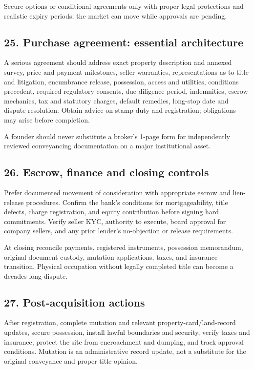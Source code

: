 Secure options or conditional agreements only with proper legal protections and realistic expiry periods; the market can move while approvals are pending.


\subsection{25. Purchase agreement: essential architecture}

A serious agreement should address exact property description and annexed survey, price and payment milestones, seller warranties, representations as to title and litigation, encumbrance release, possession, access and utilities, conditions precedent, required regulatory consents, due diligence period, indemnities, escrow mechanics, tax and statutory charges, default remedies, long-stop date and dispute resolution. Obtain advice on stamp duty and registration; obligations may arise before completion.

A founder should never substitute a broker's 1-page form for independently reviewed conveyancing documentation on a major institutional asset.


\subsection{26. Escrow, finance and closing controls}

Prefer documented movement of consideration with appropriate escrow and lien-release procedures. Confirm the bank's conditions for mortgageability, title defects, charge registration, and equity contribution before signing hard commitments. Verify seller KYC, authority to execute, board approval for company sellers, and any prior lender's no-objection or release requirements.

At closing reconcile payments, registered instruments, possession memorandum, original document custody, mutation applications, taxes, and insurance transition. Physical occupation without legally completed title can become a decades-long dispute.


\subsection{27. Post-acquisition actions}

After registration, complete mutation and relevant property-card/land-record updates, secure possession, install lawful boundaries and security, verify taxes and insurance, protect the site from encroachment and dumping, and track approval conditions. Mutation is an administrative record update, not a substitute for the original conveyance and proper title opinion.

